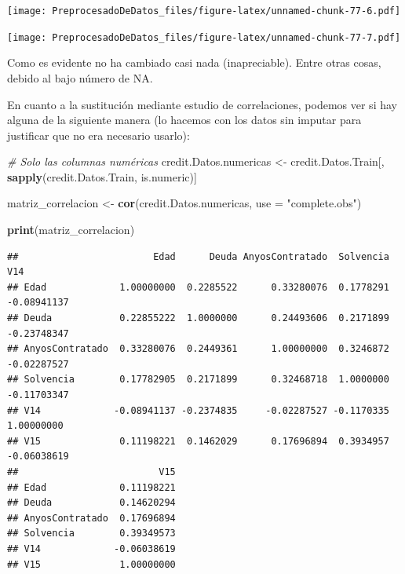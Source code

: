 \documentclass[
]{article}
\newenvironment{Shaded}{\begin{snugshade}}{\end{snugshade}}
\newcommand{\AttributeTok}[1]{\textcolor[rgb]{0.13,0.29,0.53}{#1}}
\newcommand{\CommentTok}[1]{\textcolor[rgb]{0.56,0.35,0.01}{\textit{#1}}}
\newcommand{\FunctionTok}[1]{\textcolor[rgb]{0.13,0.29,0.53}{\textbf{#1}}}
\newcommand{\NormalTok}[1]{#1}
\newcommand{\OtherTok}[1]{\textcolor[rgb]{0.56,0.35,0.01}{#1}}
\newcommand{\SpecialCharTok}[1]{\textcolor[rgb]{0.81,0.36,0.00}{\textbf{#1}}}
\newcommand{\StringTok}[1]{\textcolor[rgb]{0.31,0.60,0.02}{#1}}
\begin{document}
\texttt{[image: PreprocesadoDeDatos\_files/figure-latex/unnamed-chunk-77-6.pdf]}

\begin{Shaded}
\end{Shaded}

\texttt{[image: PreprocesadoDeDatos\_files/figure-latex/unnamed-chunk-77-7.pdf]}

Como es evidente no ha cambiado casi nada (inapreciable). Entre otras
cosas, debido al bajo número de NA.

En cuanto a la sustitución mediante estudio de correlaciones, podemos
ver si hay alguna de la siguiente manera (lo hacemos con los datos sin
imputar para justificar que no era necesario usarlo):

\begin{Shaded}
\begin{Highlighting}[]
\CommentTok{\# Solo las columnas numéricas}
\NormalTok{credit.Datos.numericas }\OtherTok{\textless{}{-}}\NormalTok{ credit.Datos.Train[, }\FunctionTok{sapply}\NormalTok{(credit.Datos.Train, is.numeric)]}

\NormalTok{matriz\_correlacion }\OtherTok{\textless{}{-}} \FunctionTok{cor}\NormalTok{(credit.Datos.numericas, }\AttributeTok{use =} \StringTok{"complete.obs"}\NormalTok{)}

\FunctionTok{print}\NormalTok{(matriz\_correlacion)}
\end{Highlighting}
\end{Shaded}

\begin{verbatim}
##                        Edad      Deuda AnyosContratado  Solvencia         V14
## Edad             1.00000000  0.2285522      0.33280076  0.1778291 -0.08941137
## Deuda            0.22855222  1.0000000      0.24493606  0.2171899 -0.23748347
## AnyosContratado  0.33280076  0.2449361      1.00000000  0.3246872 -0.02287527
## Solvencia        0.17782905  0.2171899      0.32468718  1.0000000 -0.11703347
## V14             -0.08941137 -0.2374835     -0.02287527 -0.1170335  1.00000000
## V15              0.11198221  0.1462029      0.17696894  0.3934957 -0.06038619
##                         V15
## Edad             0.11198221
## Deuda            0.14620294
## AnyosContratado  0.17696894
## Solvencia        0.39349573
## V14             -0.06038619
## V15              1.00000000
\end{verbatim}
\end{document}
